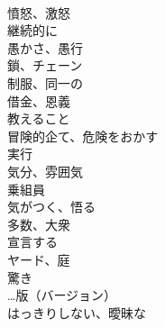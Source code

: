 \documentclass[8pt]{extreport}
\begin{document}
\begin{CJK}{UTF8}{min}
\\	憤怒、激怒
\\	継続的に
\\	愚かさ、愚行
\\	鎖、チェーン
\\	制服、同一の
\\	借金、恩義
\\	教えること
\\	冒険的企て、危険をおかす
\\	実行
\\	気分、雰囲気
\\	乗組員
\\	気がつく、悟る
\\	多数、大衆
\\	宣言する
\\	ヤード、庭
\\	驚き
\\	…版（バージョン）
\\	はっきりしない、曖昧な
\end{CJK}
\end{document}
